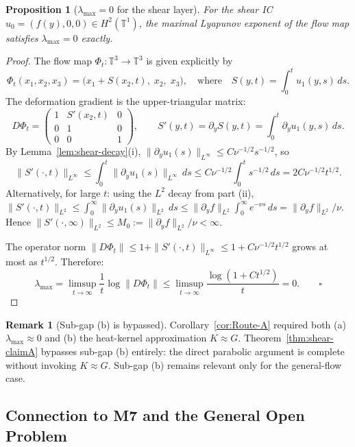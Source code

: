 \documentclass[11pt]{article}
\newtheorem{proposition}[theorem]{Proposition}
\theoremstyle{definition}
\newtheorem{remark}[theorem]{Remark}
\theoremstyle{remark}
\newcommand{\T}{\mathbb{T}}
\begin{document}
\begin{proposition}[$\lambda_{\max}=0$ for the shear layer]
\label{prop:lambda-zero}
  For the shear IC $u_0=(f(y),0,0)\in H^2(\T^1)$, the maximal Lyapunov
  exponent of the flow map satisfies $\lambda_{\max}=0$ exactly.
\end{proposition}

\begin{proof}
  The flow map $\Phi_t:\T^3\to\T^3$ is given explicitly by
  \[
    \Phi_t(x_1,x_2,x_3)
    = \bigl(x_1 + S(x_2,t),\; x_2,\; x_3\bigr),
    \quad\text{where}\quad S(y,t)=\int_0^t u_1(y,s)\,ds.
  \]
  The deformation gradient is the upper-triangular matrix:
  \[
    D\Phi_t = \begin{pmatrix}1 & S'(x_2,t) & 0\\0&1&0\\0&0&1\end{pmatrix},
    \qquad S'(y,t)=\partial_y S(y,t)=\int_0^t\partial_y u_1(y,s)\,ds.
  \]
  By Lemma~\ref{lem:shear-decay}(i), $\|\partial_y u_1(s)\|_{L^\infty}
  \leq C\nu^{-1/2}s^{-1/2}$, so
  \[
    \|S'(\cdot,t)\|_{L^\infty}
    \leq \int_0^t\|\partial_y u_1(s)\|_{L^\infty}\,ds
    \leq C\nu^{-1/2}\int_0^t s^{-1/2}\,ds
    = 2C\nu^{-1/2}t^{1/2}.
  \]
  Alternatively, for large $t$: using the $L^2$ decay from part (ii),
  $\|S'(\cdot,t)\|_{L^2}\leq \int_0^\infty\|\partial_y u_1(s)\|_{L^2}\,ds
  \leq \|\partial_y f\|_{L^2}\int_0^\infty e^{-\nu s}\,ds = \|\partial_y f\|_{L^2}/\nu$.
  Hence $\|S'(\cdot,\infty)\|_{L^2}\leq M_0:=\|\partial_y f\|_{L^2}/\nu<\infty$.

  The operator norm $\|D\Phi_t\|\leq 1 + \|S'(\cdot,t)\|_{L^\infty}
  \leq 1 + C\nu^{-1/2}t^{1/2}$ grows at most as $t^{1/2}$.  Therefore:
  \[
    \lambda_{\max} = \limsup_{t\to\infty}\frac{1}{t}\log\|D\Phi_t\|
    \leq \limsup_{t\to\infty}\frac{\log(1+Ct^{1/2})}{t} = 0.
    \qquad\square
  \]
\end{proof}

\begin{remark}[Sub-gap (b) is bypassed]
  Corollary~\ref{cor:Route-A} required both (a) $\lambda_{\max}\approx 0$
  and (b) the heat-kernel approximation $K\approx G$.
  Theorem~\ref{thm:shear-claimA} bypasses sub-gap (b) entirely:
  the direct parabolic argument is complete without invoking $K\approx G$.
  Sub-gap (b) remains relevant only for the general-flow case.
\end{remark}

\subsection{Connection to M7 and the General Open Problem}
\label{sec:shear-m7}
\end{document}
